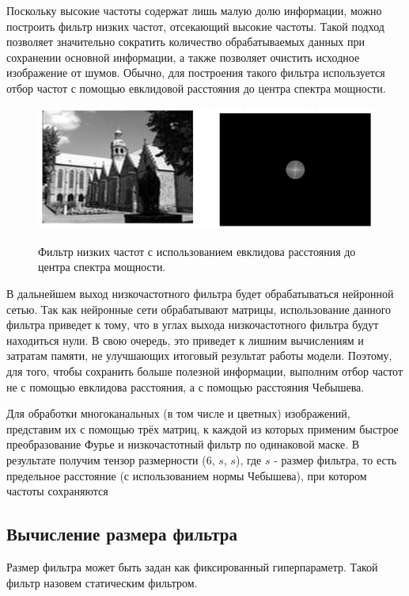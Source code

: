 \documentclass[times,specification,annotation]{itmo-student-thesis}
\begin{document}
Поскольку высокие частоты содержат лишь малую долю информации, можно построить фильтр низких частот, отсекающий высокие частоты. Такой подход позволяет значительно сократить количество обрабатываемых данных при сохранении основной информации, а также позволяет очистить исходное изображение от шумов. Обычно, для построения такого фильтра используется отбор частот с помощью евклидовой расстояния до центра спектра мощности.

\begin{figure}[H]
    \centering
    \includegraphics[width=1.0\textwidth]
    {images/solutions_analysis/fourier/low_pass_filter.png}
    \label{fig:svd_approx_im_fix_rank}
    \caption{Фильтр низких частот с использованием евклидова расстояния до центра спектра мощности.}
\end{figure}

В дальнейшем выход низкочастотного фильтра будет обрабатываться нейронной сетью. Так как нейронные сети обрабатывают матрицы, использование данного фильтра приведет к тому, что в углах выхода низкочастотного фильтра будут находиться нули. В свою очередь, это приведет к лишним вычислениям и затратам памяти, не улучшающих итоговый результат работы модели. Поэтому, для того, чтобы сохранить больше полезной информации, выполним отбор частот не с помощью евклидова расстояния, а с помощью расстояния Чебышева.


Для обработки многоканальных (в том числе и цветных) изображений, представим их с помощью трёх матриц, к каждой из которых применим быстрое преобразование Фурье и низкочастотный фильтр по одинаковой маске. В результате получим тензор размерности (6, $s$, $s$), где $s$ - размер фильтра, то есть предельное расстояние (с использованием нормы Чебышева), при котором частоты сохраняются

\subsection{Вычисление размера фильтра}
Размер фильтра может быть задан как фиксированный гиперпараметр. Такой фильтр назовем статическим фильтром.
\end{document}
